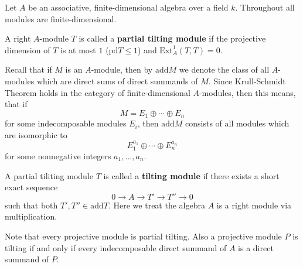 \documentclass[12pt]{article}
\begin{document}
Let $A$ be an associative, finite-dimensional algebra over a field $k$. Throughout all modules are finite-dimensional.

A right $A$-module $T$ is called a \textbf{partial tilting module} if the projective dimension of $T$ is at most $1$ ($\mathrm{pd}T\leqslant 1$) and $\mathrm{Ext}^1_A(T,T)=0$.

Recall that if $M$ is an $A$-module, then by $\mathrm{add}M$ we denote the class of all $A$-modules which are direct sums of direct summands of $M$. Since Krull-Schmidt Theorem holds in the category of finite-dimensional $A$-modules, then this means, that if
$$M=E_1\oplus\cdots\oplus E_n$$
for some indecomposable modules $E_i$, then $\mathrm{add}M$ consists of all modules which are isomorphic to
$$E_1^{a_1}\oplus\cdots\oplus E_n^{a_n}$$
for some nonnegative integers $a_1,\ldots, a_n$.

A partial tiliting module $T$ is called a \textbf{tilting module} if there exists a short exact sequence
$$
0 \rightarrow A \rightarrow T' \rightarrow T'' \rightarrow 0
$$
such that both $T',T''\in\mathrm{add}T$. Here we treat the algebra $A$ is a right module via multiplication.

Note that every projective module is partial tilting. Also a projective module $P$ is tilting if and only if every indecomposable direct summand of $A$ is a direct summand of $P$.
\end{document}
